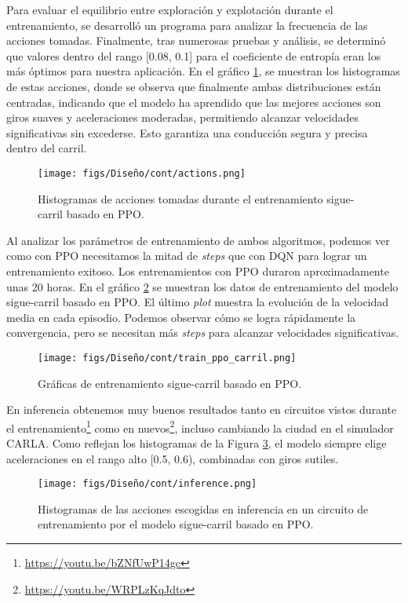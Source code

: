 Para evaluar el equilibrio entre exploración y explotación durante el entrenamiento, se desarrolló un programa para analizar la frecuencia de las acciones tomadas. Finalmente, tras numerosas pruebas y análisis, se determinó que valores dentro del rango [0.08, 0.1] para el coeficiente de entropía eran los más óptimos para nuestra aplicación. En el gráfico \ref{fig:actions_ppo_carril}, se muestran los histogramas de estas acciones, donde se observa que finalmente ambas distribuciones están centradas, indicando que el modelo ha aprendido que las mejores acciones son giros suaves y aceleraciones moderadas, permitiendo alcanzar velocidades significativas sin excederse. Esto garantiza una conducción segura y precisa dentro del carril.

\begin{figure}[ht]
  \centering
  \texttt{[image: figs/Diseño/cont/actions.png]}
  \caption{Histogramas de acciones tomadas durante el entrenamiento sigue-carril basado en \ac{PPO}.}
  \label{fig:actions_ppo_carril}
\end{figure}

\newpage

Al analizar los parámetros de entrenamiento de ambos algoritmos, podemos ver como con \ac{PPO} necesitamos la mitad de \textit{steps} que con \ac{DQN} para lograr un entrenamiento exitoso. Los entrenamientos con \ac{PPO} duraron aproximadamente unas 20 horas. En el gráfico \ref{fig:train_ppo_carril} se muestran los datos de entrenamiento del modelo sigue-carril basado en \ac{PPO}. El último \textit{plot} muestra la evolución de la velocidad media en cada episodio. Podemos observar cómo se logra rápidamente la convergencia, pero se necesitan más \textit{steps} para alcanzar velocidades significativas.
\begin{figure}[ht]
\centering
\texttt{[image: figs/Diseño/cont/train\_ppo\_carril.png]}
\caption{Gráficas de entrenamiento sigue-carril basado en \ac{PPO}.}
\label{fig:train_ppo_carril}
\end{figure}

En inferencia obtenemos muy buenos resultados tanto en circuitos vistos durante el entrenamiento\footnote{\url{https://youtu.be/bZNfUwP14gc}} como en nuevos\footnote{\url{https://youtu.be/WRPLzKqJdto}}, incluso cambiando la ciudad en el simulador CARLA. Como reflejan los histogramas de la Figura \ref{fig:inference_ppo_carril}, el modelo siempre elige aceleraciones en el rango alto [0.5, 0.6), combinadas con giros sutiles.
\begin{figure}[ht]
\centering
\texttt{[image: figs/Diseño/cont/inference.png]}
\caption{Histogramas de las acciones escogidas en inferencia en un circuito de entrenamiento por el modelo sigue-carril basado en \ac{PPO}.}
\label{fig:inference_ppo_carril}
\end{figure} 

